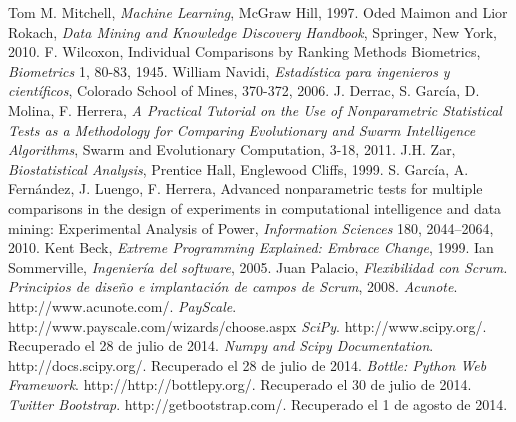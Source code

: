 
\begin{thebibliography}{99}
 Tom M. Mitchell, \textit{Machine Learning}, McGraw Hill, 1997.
 Oded Maimon and Lior Rokach, \textit{Data Mining and Knowledge Discovery Handbook}, Springer, New York, 2010.
 F. Wilcoxon, Individual Comparisons by Ranking Methods Biometrics, \textit{Biometrics} 1, 80-83, 1945.
 William Navidi, \textit{Estadística para ingenieros y científicos}, Colorado School of Mines, 370-372, 2006.
 J. Derrac, S. García, D. Molina, F. Herrera, \textit{A Practical Tutorial on the Use of Nonparametric Statistical Tests as a Methodology for Comparing Evolutionary and Swarm Intelligence Algorithms}, Swarm and Evolutionary Computation, 3-18, 2011.
 J.H. Zar, \textit{Biostatistical Analysis}, Prentice Hall, Englewood Cliffs, 1999.
 S. García, A. Fernández, J. Luengo, F. Herrera, Advanced nonparametric tests for multiple comparisons in the design of experiments in computational intelligence and data mining: Experimental Analysis of Power, \textit{Information Sciences} 180, 2044–2064, 2010.
 Kent Beck, \textit{Extreme Programming Explained: Embrace Change}, 1999.
 Ian Sommerville, \textit{Ingeniería del software}, 2005.
 Juan Palacio, \textit{Flexibilidad con Scrum. Principios de diseño e implantación de campos de Scrum}, 2008.
 \textit{Acunote}. http://www.acunote.com/.
 \textit{PayScale}. http://www.payscale.com/wizards/choose.aspx
 \textit{SciPy}. http://www.scipy.org/. Recuperado el 28 de julio de 2014.
 \textit{Numpy and Scipy Documentation}. http://docs.scipy.org/. Recuperado el 28 de julio de 2014.
 \textit{Bottle: Python Web Framework}. http://http://bottlepy.org/. Recuperado el 30 de julio de 2014.
 \textit{Twitter Bootstrap}. http://getbootstrap.com/. Recuperado el 1 de agosto de 2014.

\end{thebibliography}
